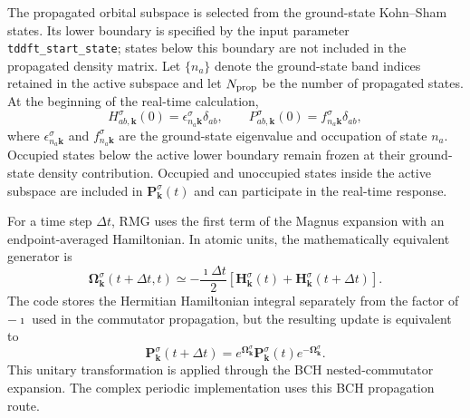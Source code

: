 The propagated orbital subspace is selected from the ground-state
Kohn--Sham states.  Its lower boundary is specified by the input
parameter \texttt{tddft\_start\_state}; states below this boundary are
not included in the propagated density matrix.  Let $\{n_a\}$ denote
the ground-state band indices retained in the active subspace and let
$N_{\rm prop}$ be the number of propagated states.  At the beginning of
the real-time calculation,
\begin{equation}
  H_{ab,\mathbf k}^{\sigma}(0)
  =
  \epsilon_{n_a\mathbf k}^{\sigma}\delta_{ab},
  \qquad
  P_{ab,\mathbf k}^{\sigma}(0)
  =
  f_{n_a\mathbf k}^{\sigma}\delta_{ab},
  \label{eq:impl_initial_h_p}
\end{equation}
where $\epsilon_{n_a\mathbf k}^{\sigma}$ and
$f_{n_a\mathbf k}^{\sigma}$ are the ground-state eigenvalue and
occupation of state $n_a$.  Occupied states below the active lower
boundary remain frozen at their ground-state density contribution.
Occupied and unoccupied states inside the active subspace are included
in $\mathbf P_{\mathbf k}^{\sigma}(t)$ and can participate in the
real-time response.

For a time step $\Delta t$, RMG uses the first term of the Magnus
expansion with an endpoint-averaged Hamiltonian.  In atomic units, the
mathematically equivalent generator is
\begin{equation}
  \boldsymbol{\Omega}_{\mathbf k}^{\sigma}(t+\Delta t,t)
  \simeq
  -\frac{\imath\Delta t}{2}
  \left[
    \mathbf H_{\mathbf k}^{\sigma}(t)
    +
    \mathbf H_{\mathbf k}^{\sigma}(t+\Delta t)
  \right].
  \label{eq:impl_endpoint_magnus}
\end{equation}
The code stores the Hermitian Hamiltonian integral separately from the
factor of $-\imath$ used in the commutator propagation, but the
resulting update is equivalent to
\begin{equation}
  \mathbf P_{\mathbf k}^{\sigma}(t+\Delta t)
  =
  e^{\boldsymbol{\Omega}_{\mathbf k}^{\sigma}}
  \mathbf P_{\mathbf k}^{\sigma}(t)
  e^{-\boldsymbol{\Omega}_{\mathbf k}^{\sigma}} .
  \label{eq:impl_density_update}
\end{equation}
This unitary transformation is applied through the BCH
nested-commutator expansion.  The complex periodic implementation uses
this BCH propagation route.

